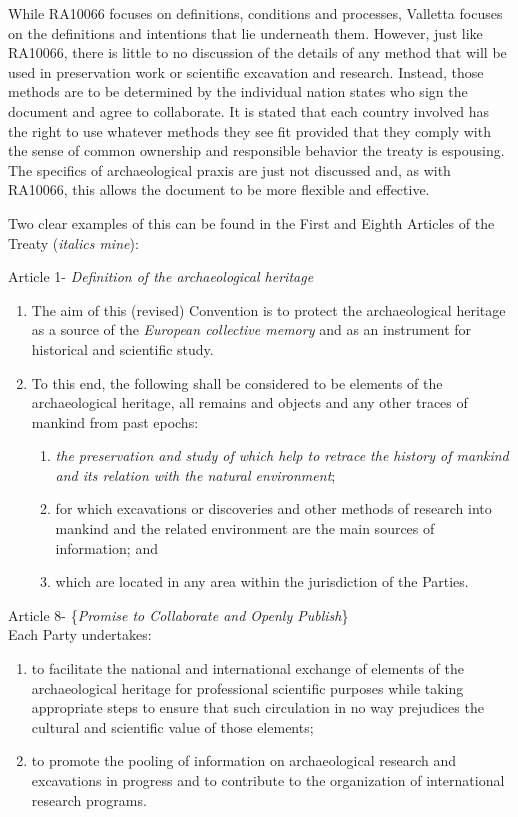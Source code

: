 \documentclass[english]{ijsra}
\begin{document}
While RA10066 focuses on definitions, conditions and processes, Valletta focuses on the definitions and intentions that lie underneath them. However, just like RA10066, there is little to no discussion of the details of any method that will be used in preservation work or scientific excavation and research. Instead, those methods are to be determined by the individual nation states who sign the document and agree to collaborate. It is stated that each country involved has the right to use whatever methods they see fit provided that they comply with the sense of common ownership and responsible behavior the treaty is espousing. The specifics of archaeological praxis are just not discussed and, as with RA10066, this allows the document to be more flexible and effective. 

Two clear examples of this can be found in the First and Eighth Articles of the Treaty (\textit{italics mine}): 

\begin{displayquote}
	Article 1- \textit{Definition of the archaeological heritage}
	\begin{enumerate}
		\item The aim of this (revised) Convention is to protect the archaeological heritage as a source of the \textit{European collective memory} and as an instrument for historical and scientific study.
		\item To this end, {the following} shall be considered to be elements of the archaeological heritage, all remains and objects and any other traces of mankind from past epochs:
		\begin{enumerate}
			\item \textit{the preservation and study of which help to retrace the history of mankind and its relation with the natural environment};
			\item for which excavations or discoveries and other methods of research into mankind and the related environment are the main sources of information; and
			\item which are located in any area within the jurisdiction of the Parties. \parencite[2]{Valletta_1992}
		\end{enumerate}
	\end{enumerate}
	Article 8- \{\textit{Promise to Collaborate and Openly Publish}\}\\
	Each Party undertakes:
	\begin{enumerate}
		\item to facilitate the national and international exchange of elements of the archaeological heritage for professional scientific purposes while taking appropriate steps to ensure that such circulation in no way prejudices the cultural and scientific value of those elements;
		\item to promote the pooling of information on archaeological research and excavations in progress and to contribute to the organization of international research programs. \parencite[4]{Valletta_1992}
	\end{enumerate}
\end{displayquote}
\end{document}

